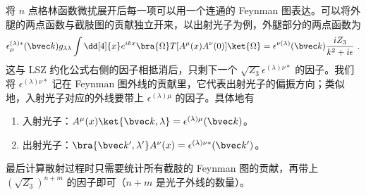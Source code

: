 将 $n$ 点格林函数微扰展开后每一项可以用一个连通的 Feynman 图表达。可以将外腿的两点函数与截肢图的贡献独立开来，以出射光子为例，外腿部分的两点函数为
\[
\epsilon_\mu^{(\lambda)*}(\bvec k)g_{\lambda\lambda}\int \dd[4]{x} e^{ikx} \bra{\Omega}T[A^\mu(x)A^\nu(0)]\ket{\Omega}= \epsilon^{\nu(\lambda)}(\bvec k)\frac{iZ_3}{k^2+i\epsilon}~.
\]
这与 LSZ 约化公式右侧的因子相抵消后，只剩下一个 $\sqrt{Z_3}\epsilon^{ (\lambda)\nu*}$ 的因子。我们将 $\epsilon^{(\lambda)\nu*}$ 记在 Feynman 图外线的贡献里，它代表出射光子的偏振方向；类似地，入射光子对应的外线要带上 $\epsilon^{(\lambda)\mu}$ 的因子。具体地有
\begin{enumerate}
\item 入射光子：$A^\mu(x) \ket{\bvec k,\lambda}=\epsilon^{(\lambda)\mu}(\bvec k)$。
\item 出射光子：$\bra{\bvec k',\lambda'}A^\nu(x)=\epsilon^{(\lambda)\nu*}(\bvec k')$。
\end{enumerate}
最后计算散射过程时只需要统计所有截肢的 Feynman 图的贡献，再带上 $(\sqrt{Z_3})^{n+m}$ 的因子即可（$n+m$ 是光子外线的数量）。